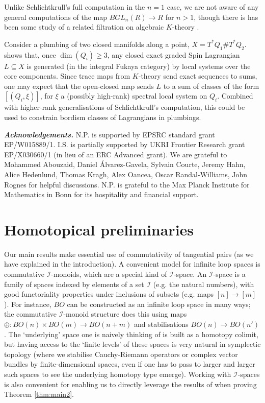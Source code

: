 \documentclass{TPmod}
\newcommand{\cI}{\mathcal{I}}
\numberwithin{equation}{section}
\begin{document}
    Unlike Schlichtkrull's full computation in the $n=1$ case, we are not aware of any general computations of the map $BGL_n(R) \to R$ for $n > 1$, though there is has been some study of a related filtration on algebraic $K$-theory \cite{Rognes}. 

    Consider a plumbing of two closed manifolds along a point, $X=T^*Q_1 \# T^*Q_2$. \cite{AS:plumbings} shows that, once $\dim(Q_i) \geq 3$,  any closed exact graded Spin Lagrangian $L \subseteq X$ is generated (in the integral Fukaya category) by local systems over the core components. Since trace maps from $K$-theory send exact sequences to sums, one may expect that the open-closed map sends $L$ to a sum of classes of the form $[(Q_i, \xi)]$, for $\xi$ a (possibly high-rank) spectral local system on $Q_i$. Combined with higher-rank generalisations of Schlichtkrull's computation, this could be used to constrain bordism classes of Lagrangians in plumbings.




\noindent \textbf{\emph{Acknowledgements.}} N.P. is supported by EPSRC standard grant EP/W015889/1.  I.S. is partially supported by UKRI Frontier Research grant EP/X030660/1 (in lieu of an ERC Advanced grant).  We are grateful to Mohammed Abouzaid, Daniel Álvarez-Gavela, Sylvain Courte, Jeremy Hahn, Alice Hedenlund, Thomas Kragh, Alex Oancea, Oscar Randal-Williams, John Rognes for helpful discussions. N.P. is grateful to the Max Planck Institute for Mathematics in Bonn for its hospitality and financial support. 



\section{Homotopical preliminaries}\label{sec: htpy prel}

Our main results make essential use of commutativity of tangential pairs (as we have explained in the introduction). A convenient model for infinite loop spaces is commutative $\cI$-monoids, which are a special kind of $\cI$-space. An $\cI$-space is a family of spaces indexed by elements of a set $\cI$ (e.g. the natural numbers), with good functoriality properties under inclusions of subsets (e.g. maps $[n] \to [m]$). For instance, $BO$ can be constructed as an infinite loop space in many ways; the commutative $\cI$-monoid structure does this using maps $\oplus: BO(n) \times BO(m) \to BO(n+m)$ and stabilisations $BO(n) \to BO(n')$. The `underlying’ space one is naively thinking of is built as a homotopy colimit, but having access to the `finite levels’ of these spaces is very natural in symplectic topology (where we stabilise Cauchy-Riemann operators or complex vector bundles by finite-dimensional spaces, even if one has to pass to larger and larger such spaces to see the underlying homotopy type emerge).  Working with $\cI$-spaces is also convenient for enabling us to directly leverage the results of  \cite{Schlichtkrull} when proving Theorem \ref{thm:main2}. 
\end{document}
